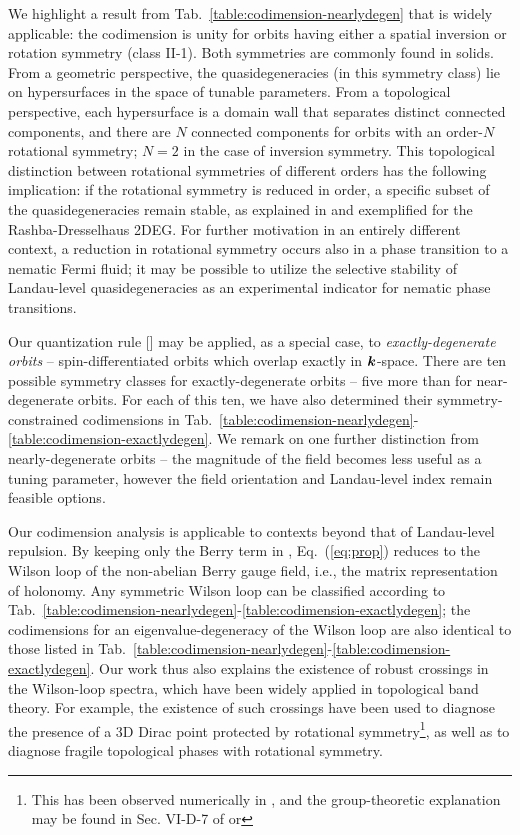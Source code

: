 \documentclass[aps, showpacs, twocolumn, notitlepage, superscriptaddress]{revtex4-1}
\begin{document}
We highlight a result from  Tab.\ \ref{table:codimension-nearlydegen} that is widely applicable: the codimension is unity for orbits having either a spatial inversion or rotation symmetry (class II-1). Both symmetries are commonly found in solids. From a geometric perspective, the quasidegeneracies (in this symmetry class) lie on hypersurfaces in the space of tunable parameters. From a topological perspective, each hypersurface is a domain wall that separates distinct connected components, and there are $N$ connected components for orbits with an order-$N$ rotational symmetry; $N=2$ in the case of inversion symmetry. This topological distinction between rotational symmetries of different orders has the following implication: if the rotational symmetry is reduced in order, a specific subset of the quasidegeneracies remain stable, as explained in  and exemplified for the Rashba-Dresselhaus 2DEG.  For further motivation in an entirely different context, a reduction in rotational symmetry   occurs also in a phase transition to a nematic Fermi fluid\cite{fradkin_nematic_2010}; it may be possible to utilize  the selective stability of Landau-level quasidegeneracies as an experimental indicator for nematic phase transitions. 

Our quantization rule [] may be applied, as a special case, to \textit{exactly-degenerate orbits} -- spin-differentiated orbits which overlap exactly in $\boldsymbol{k}$-space. There are ten possible symmetry classes for exactly-degenerate orbits -- five more than for near-degenerate orbits. For each of this ten, we have also determined their symmetry-constrained codimensions in Tab.\ \ref{table:codimension-nearlydegen}-\ref{table:codimension-exactlydegen}. We remark on one further distinction from nearly-degenerate orbits --  the magnitude of the field becomes less useful as a tuning parameter, however the field orientation and Landau-level index remain feasible options.


Our codimension analysis is applicable to contexts beyond that of Landau-level repulsion. By keeping only the Berry term in , Eq.\ ({\ref{eq:prop}}) reduces to the Wilson loop of the non-abelian Berry gauge field\cite{wilczek_appearance_1984}, i.e., the matrix representation of holonomy.  Any symmetric Wilson loop can be classified according to Tab.\ \ref{table:codimension-nearlydegen}-\ref{table:codimension-exactlydegen}; the codimensions for an eigenvalue-degeneracy of the Wilson loop are also identical to those listed in Tab.\ \ref{table:codimension-nearlydegen}-\ref{table:codimension-exactlydegen}. Our work thus also explains the existence of robust crossings in the Wilson-loop spectra, which have been widely applied in topological band theory. For example, the existence of such crossings have been used to diagnose the presence of a 3D Dirac point protected by rotational symmetry\footnote{This has been observed numerically in , and the group-theoretic explanation may be found in Sec. VI-D-7 of  or }, as well as to diagnose fragile topological phases with rotational symmetry\cite{bouhon_wilson_2018,bradlyn_disconnected_2018}.
\end{document}
